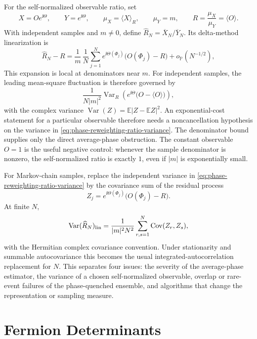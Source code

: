 For the self-normalized observable ratio, set
\[
  X=Oe^{\ii\Theta},\qquad
  Y=e^{\ii\Theta},\qquad
  \mu_X=\langle X\rangle_R,\qquad
  \mu_Y=m,\qquad
  R=\frac{\mu_X}{\mu_Y}=\langle O\rangle .
\]
With independent samples and \(m\ne0\), define
\(\widehat R_N=\overline X_N/\overline Y_N\).  Its delta-method linearization is
\begin{equation}
  \widehat R_N-R
  =
  \frac1m\,\frac1N
  \sum_{j=1}^{N}
  e^{\ii\Theta(\Phi_j)}\bigl(O(\Phi_j)-R\bigr)
  +o_{\mathbb P}(N^{-1/2}),
  \label{eq:phase-reweighting-ratio-linearization}
\end{equation}
This expansion is local at denominators near \(m\).  For independent samples,
the leading mean-square fluctuation is therefore governed by
\begin{equation}
  \frac{1}{N|m|^2}
  \operatorname{Var}_R\!\left(
    e^{\ii\Theta}\bigl(O-\langle O\rangle\bigr)
  \right),
  \label{eq:phase-reweighting-ratio-variance}
\end{equation}
with the complex variance \(\operatorname{Var}(Z)=\mathbb E|Z-\mathbb EZ|^2\).
An exponential-cost statement for a particular observable therefore needs a
noncancellation hypothesis on the variance in
\eqref{eq:phase-reweighting-ratio-variance}.  The denominator bound supplies
only the direct average-phase obstruction.  The constant observable \(O=1\) is
the useful negative control: whenever the sample denominator is nonzero, the
self-normalized ratio is exactly \(1\), even if \(|m|\) is exponentially small.

For Markov-chain samples, replace the independent variance in
\eqref{eq:phase-reweighting-ratio-variance} by the covariance sum of the
residual process
\[
  Z_j=e^{\ii\Theta(\Phi_j)}\bigl(O(\Phi_j)-R\bigr).
\]
At finite \(N\),
\[
  \operatorname{Var}(\widehat R_N)_{\rm lin}
  =
  \frac{1}{|m|^2N^2}
  \sum_{r,s=1}^{N}
  \operatorname{Cov}(Z_r,Z_s),
\]
with the Hermitian complex covariance convention.  Under stationarity and
summable autocovariance this becomes the usual integrated-autocorrelation
replacement for \(N\).  This separates four issues: the severity of the
average-phase estimator, the variance of a chosen self-normalized observable,
overlap or rare-event failures of the phase-quenched ensemble, and algorithms
that change the representation or sampling measure.

\section{Fermion Determinants}

